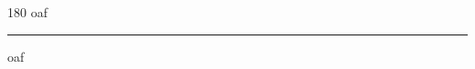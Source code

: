 
\begin{frame}
\begin{center}
\begin{turn}{180}
{\fontsize{2.5cm}{1em}\selectfont oaf}
\end{turn}
\vspace{1em}\par  
\hrule
\vspace{1em}\par  
{\fontsize{2.5cm}{1em}\selectfont oaf}
\end{center}
\end{frame}
